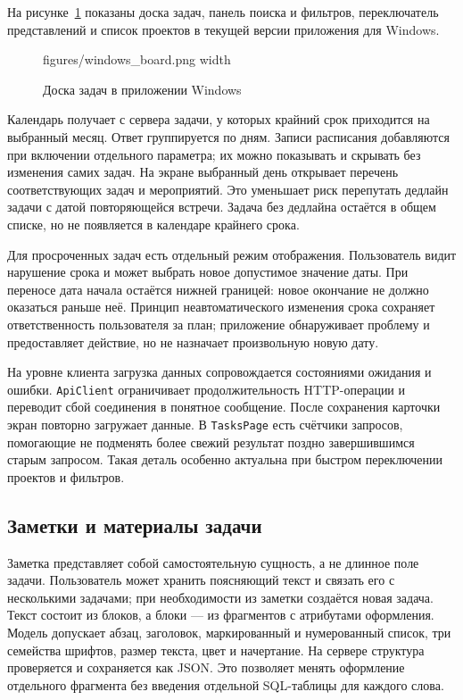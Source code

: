 \documentclass[14pt,a4paper]{extarticle}
\begin{document}
На рисунке~\ref{fig:tasks-board} показаны доска задач, панель поиска и фильтров, переключатель представлений и список проектов в текущей версии приложения для Windows.

\begin{figure}[!htbp]
\centering
\XeTeXpicfile figures/windows_board.png width \linewidth
\caption{Доска задач в приложении Windows}
\label{fig:tasks-board}
\end{figure}

Календарь получает с сервера задачи, у которых крайний срок приходится на выбранный месяц. Ответ группируется по дням. Записи расписания добавляются при включении отдельного параметра; их можно показывать и скрывать без изменения самих задач. На экране выбранный день открывает перечень соответствующих задач и мероприятий. Это уменьшает риск перепутать дедлайн задачи с датой повторяющейся встречи. Задача без дедлайна остаётся в общем списке, но не появляется в календаре крайнего срока.

Для просроченных задач есть отдельный режим отображения. Пользователь видит нарушение срока и может выбрать новое допустимое значение даты. При переносе дата начала остаётся нижней границей: новое окончание не должно оказаться раньше неё. Принцип неавтоматического изменения срока сохраняет ответственность пользователя за план; приложение обнаруживает проблему и предоставляет действие, но не назначает произвольную новую дату.

На уровне клиента загрузка данных сопровождается состояниями ожидания и ошибки. \texttt{ApiClient} ограничивает продолжительность HTTP-операции и переводит сбой соединения в понятное сообщение. После сохранения карточки экран повторно загружает данные. В \texttt{TasksPage} есть счётчики запросов, помогающие не подменять более свежий результат поздно завершившимся старым запросом. Такая деталь особенно актуальна при быстром переключении проектов и фильтров.

\subsection{Заметки и материалы задачи}

Заметка представляет собой самостоятельную сущность, а не длинное поле задачи. Пользователь может хранить поясняющий текст и связать его с несколькими задачами; при необходимости из заметки создаётся новая задача. Текст состоит из блоков, а блоки --- из фрагментов с атрибутами оформления. Модель допускает абзац, заголовок, маркированный и нумерованный список, три семейства шрифтов, размер текста, цвет и начертание. На сервере структура проверяется и сохраняется как JSON. Это позволяет менять оформление отдельного фрагмента без введения отдельной SQL-таблицы для каждого слова.
\end{document}
